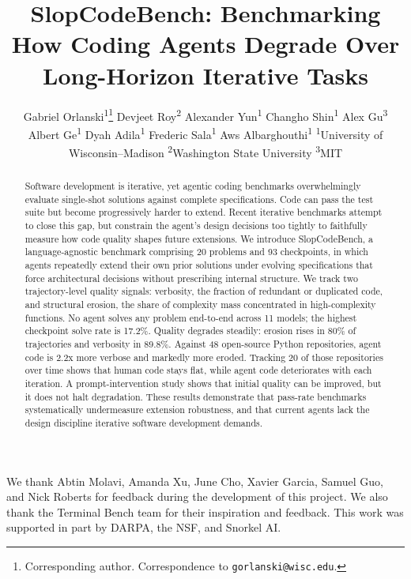 \documentclass{article}
\title{SlopCodeBench: Benchmarking How Coding Agents Degrade Over Long-Horizon Iterative Tasks}
\author{
  Gabriel Orlanski\textsuperscript{1}\thanks{Corresponding author. Correspondence to \texttt{gorlanski@wisc.edu}.} \And
  Devjeet Roy\textsuperscript{2} \And
  Alexander Yun\textsuperscript{1} \And
  Changho Shin\textsuperscript{1} \And
  Alex Gu\textsuperscript{3} \And
  Albert Ge\textsuperscript{1} \And
  Dyah Adila\textsuperscript{1} \And
  Frederic Sala\textsuperscript{1} \And
  Aws Albarghouthi\textsuperscript{1} \AND
  \normalfont\textsuperscript{1}University of Wisconsin--Madison \quad
  \textsuperscript{2}Washington State University \quad
  \textsuperscript{3}MIT
}
\begin{document}
\maketitle

\begin{abstract}
Software development is iterative, yet agentic coding benchmarks overwhelmingly evaluate single-shot solutions against complete specifications. Code can pass the test suite but become progressively harder to extend.
%
Recent iterative benchmarks attempt to close this gap, but constrain the agent's design decisions too tightly to faithfully measure how code quality shapes future extensions.
%
We introduce SlopCodeBench, a language-agnostic benchmark comprising 20 problems and 93 checkpoints, in which agents repeatedly extend their own prior solutions under evolving specifications that force architectural decisions without prescribing internal structure.
%
We track two trajectory-level quality signals: verbosity, the fraction of redundant or duplicated code, and structural erosion, the share of complexity mass concentrated in high-complexity functions.
%
No agent solves any problem end-to-end across 11 models; the highest checkpoint solve rate is 17.2\%.
%
Quality degrades steadily: erosion rises in 80\% of trajectories and verbosity in 89.8\%.
Against 48 open-source Python repositories, agent code is 2.2x more verbose and markedly more eroded.
%
Tracking 20 of those repositories over time shows that human code stays flat, while agent code deteriorates with each iteration.
%
A prompt-intervention study shows that initial quality can be improved, but it does not halt degradation.
%
These results demonstrate that pass-rate benchmarks systematically undermeasure extension robustness, and that current agents lack the design discipline iterative software development demands.
\end{abstract}








\begin{ack}
We thank Abtin Molavi, Amanda Xu, June Cho, Xavier Garcia, Samuel Guo, and Nick Roberts for feedback during the development of this project. We also thank the Terminal Bench team for their inspiration and feedback. This work was supported in part by DARPA, the NSF, and Snorkel AI.
\end{ack}



\appendix








\end{document}
